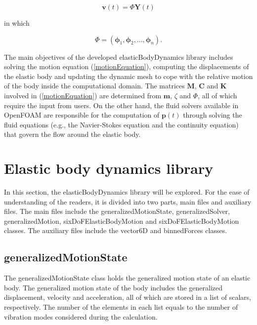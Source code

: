 \begin{equation}
\boldsymbol{v}(t) = \boldsymbol{\varPhi}\boldsymbol{Y}(t)
\end{equation}

\noindent in which

\begin{equation}
\boldsymbol{\varPhi} = \left(\boldsymbol{\phi}_1,\boldsymbol{\phi}_2,...,\boldsymbol{\phi}_n\right).
\end{equation}

The main objectives of the developed elasticBodyDynamics library includes solving the motion equation (\ref{motionEquation}), computing the displacements of the elastic body and updating the dynamic mesh to cope with the relative motion of the body inside the computational domain. The matrices $\boldsymbol{M}$, $\boldsymbol{C}$ and $\boldsymbol{K}$ involved in (\ref{motionEquation}) are determined from $\boldsymbol{m}$, $\zeta$ and $\boldsymbol{\varPhi}$, all of which require the input from users. On the other hand, the fluid solvers available in OpenFOAM are responsible for the computation of $\boldsymbol{p}(t)$ through solving the fluid equations (e.g., the Navier-Stokes equation and the continuity equation) that govern the flow around the elastic body.

\section{Elastic body dynamics library}

In this section, the elasticBodyDynamics library will be explored. For the ease of understanding of the readers, it is divided into two parts, main files and auxiliary files. The main files include the generalizedMotionState, generalizedSolver, generalizedMotion, sixDoFElasticBodyMotion and sixDoFElasticBodyMotion classes. The auxiliary files include the vector6D and binnedForces classes.

\subsection{generalizedMotionState}

The generalizedMotionState class holds the generalized motion state of an elastic body. The generalized motion state of the body includes the generalized displacement, velocity and acceleration, all of which are stored in a list of scalars, respectively. The number of the elements in each list equals to the number of vibration modes considered during the calculation.

